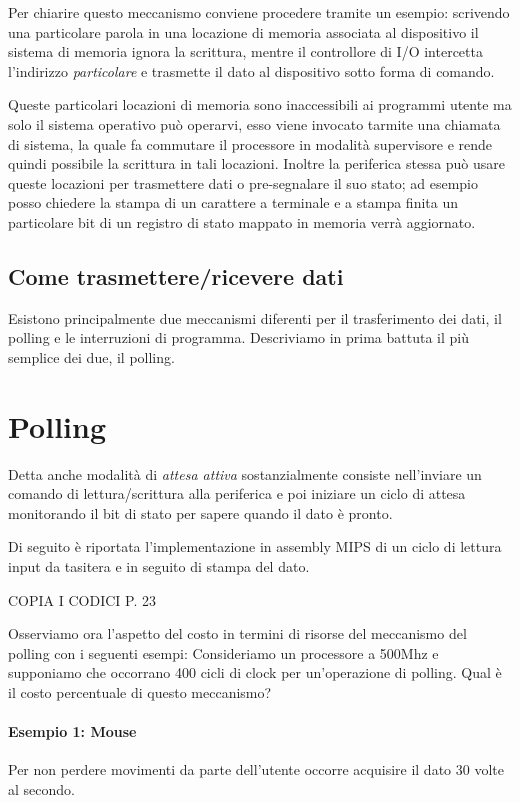 \documentclass[class=book, crop=false, oneside]{standalone}
\begin{document}
Per chiarire questo meccanismo conviene procedere tramite un esempio:
scrivendo una particolare parola in una locazione di memoria associata al dispositivo il sistema di memoria ignora la scrittura, mentre il controllore di I/O intercetta l’indirizzo \emph{particolare} e trasmette il dato al dispositivo sotto forma di comando.

Queste particolari locazioni di memoria sono inaccessibili ai programmi utente ma solo il sistema operativo può operarvi, esso viene invocato tarmite una chiamata di sistema, la quale fa commutare il processore in modalità supervisore e rende quindi possibile la scrittura in tali locazioni.
Inoltre la periferica stessa può usare queste locazioni per trasmettere dati o pre-segnalare il suo stato; ad esempio posso chiedere la stampa di un carattere a terminale e a stampa finita un particolare bit di un registro di stato mappato in memoria verrà aggiornato.

\subsection{Come trasmettere/ricevere dati}
Esistono principalmente due meccanismi diferenti per il trasferimento dei dati, il polling e le interruzioni di programma.
Descriviamo in prima battuta il più semplice dei due, il polling.

\section{Polling}
Detta anche modalità di \emph{attesa attiva} sostanzialmente consiste nell'inviare un comando di lettura/scrittura alla periferica e poi iniziare un ciclo di attesa monitorando il bit di stato per sapere quando il dato è pronto.

Di seguito è riportata l'implementazione in assembly MIPS di un ciclo di lettura input da tasitera e in seguito di stampa del dato.

COPIA I CODICI P. 23

Osserviamo ora l'aspetto del costo in termini di risorse del meccanismo del polling con i seguenti esempi:
Consideriamo un processore a 500Mhz e supponiamo che occorrano 400 cicli di clock per un’operazione di polling. Qual è il costo percentuale di questo meccanismo?

\paragraph{Esempio 1: Mouse} Per non perdere movimenti da parte dell’utente occorre acquisire il dato 30 volte al secondo.
\end{document}

